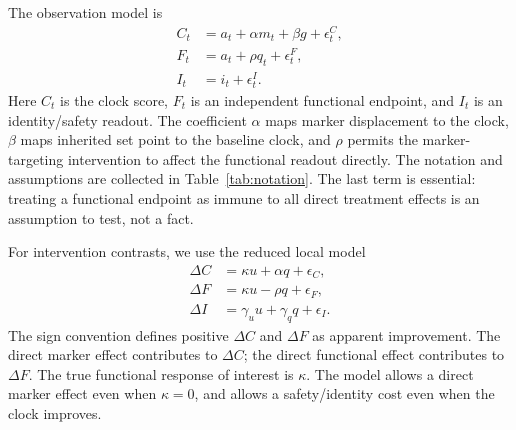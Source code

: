\documentclass[10pt,a4paper]{article}
\begin{document}
The observation model is
\begin{align}
C_t &= a_t + \alpha m_t + \beta g + \epsilon^C_t, \label{eq:clock}\\
F_t &= a_t + \rho q_t + \epsilon^F_t, \label{eq:function}\\
I_t &= i_t + \epsilon^I_t. \label{eq:identity}
\end{align}
Here \(C_t\) is the clock score, \(F_t\) is an independent functional endpoint, and \(I_t\) is an identity/safety readout. The coefficient \(\alpha\) maps marker displacement to the clock, \(\beta\) maps inherited set point to the baseline clock, and \(\rho\) permits the marker-targeting intervention to affect the functional readout directly. The notation and assumptions are collected in Table~\ref{tab:notation}. The last term is essential: treating a functional endpoint as immune to all direct treatment effects is an assumption to test, not a fact.

For intervention contrasts, we use the reduced local model
\begin{align}
\Delta C &= \kappa u + \alpha q + \epsilon_C, \label{eq:dclock}\\
\Delta F &= \kappa u - \rho q + \epsilon_F, \label{eq:dfunction}\\
\Delta I &= \gamma_u u + \gamma_q q + \epsilon_I. \label{eq:didentity}
\end{align}
The sign convention defines positive \(\Delta C\) and \(\Delta F\) as apparent improvement. The direct marker effect contributes to \(\Delta C\); the direct functional effect contributes to \(\Delta F\). The true functional response of interest is \(\kappa\). The model allows a direct marker effect even when \(\kappa=0\), and allows a safety/identity cost even when the clock improves.
\end{document}
